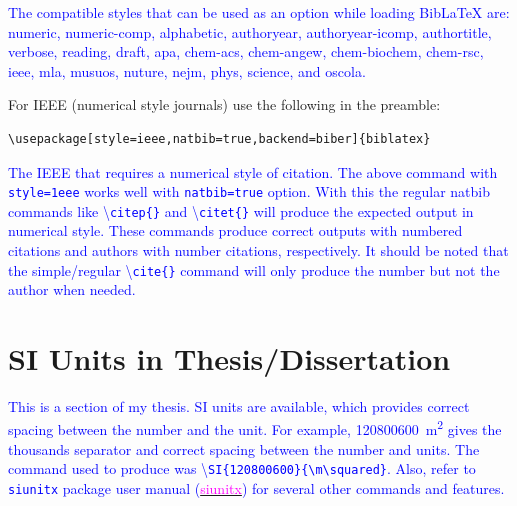 \documentclass[phd]{ndsu-thesis-2022}
\newcommand\italk[1]{\textcolor{blue}{#1}}  %
\newcommand\cmd[1]{\textbackslash\texttt{#1}}  %
\begin{document}
\italk{The compatible styles that can be used as an option while loading Bib\LaTeX\/ are: \textbullet\:numeric, \textbullet\:numeric-comp, \textbullet\:alphabetic, \textbullet\:authoryear, \textbullet\:authoryear-icomp, \textbullet\:authortitle, \textbullet\:verbose, \textbullet\:reading, \textbullet\:draft, \textbullet\:apa, \textbullet\:chem-acs, \textbullet\:chem-angew, \textbullet\:chem-biochem, \textbullet\:chem-rsc, \textbullet\:ieee, \textbullet\:mla, \textbullet\:musuos, \textbullet\:nuture, \textbullet\:nejm, \textbullet\:phys, \textbullet\:science, and \textbullet\:oscola.}

For IEEE (numerical style journals) use the following in the preamble:

\vspace{1ex}
{\singlespacing
\begin{verbatim}
\usepackage[style=ieee,natbib=true,backend=biber]{biblatex}
\end{verbatim}
}

\italk{The IEEE that requires a numerical style of citation. The above command with \texttt{style=1eee} works well with \texttt{natbib=true} option. With this the regular natbib commands like \cmd{citep\{\}} and \cmd{citet\{\}} will produce the expected output in numerical style. These commands produce correct outputs with numbered citations and authors with number citations, respectively. It should be noted that the simple/regular \cmd{cite\{\}} command will only produce the number but not the author when needed.}




\section{SI Units in Thesis/Dissertation}
\italk{This is a section of my thesis. SI units are available, which provides correct spacing between the number and the unit. For example, \qty{120800600}{\m\squared} gives the thousands separator and correct spacing between the number and units. The command used to produce was \textbackslash\texttt{SI\{120800600\}\{\textbackslash m\textbackslash squared\}}.  Also, refer to \texttt{siunitx} package user manual (\href{https://mirror.mwt.me/ctan/macros/latex/contrib/siunitx/siunitx.pdf}{\textcolor{magenta}{siunitx}}) for several other commands and features.} 
\end{document}
